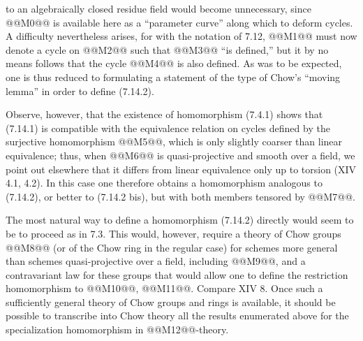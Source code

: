 to an algebraically closed residue field would become unnecessary, since @@M0@@ is available here as a ``parameter curve'' along which to deform cycles. A difficulty nevertheless arises, for with the notation of 7.12, @@M1@@ must now denote a cycle on @@M2@@ such that @@M3@@ ``is defined,'' but it by no means follows that the cycle @@M4@@ is also defined. As was to be expected, one is thus reduced to formulating a statement of the type of Chow's ``moving lemma'' in order to define (7.14.2).

Observe, however, that the existence of homomorphism (7.4.1) shows that (7.14.1) is compatible with the equivalence relation on cycles defined by the surjective homomorphism @@M5@@, which is only slightly coarser than linear equivalence; thus, when @@M6@@ is quasi-projective and smooth over a field, we point out elsewhere that it differs from linear equivalence only up to torsion (XIV 4.1, 4.2). In this case one therefore obtains a homomorphism analogous to (7.14.2), or better to (7.14.2 bis), but with both members tensored by @@M7@@.

The most natural way to define a homomorphism (7.14.2) directly would seem to be to proceed as in 7.3. This would, however, require a theory of Chow groups @@M8@@ (or of the Chow ring in the regular case) for schemes more general than schemes quasi-projective over a field, including @@M9@@, and a contravariant law for these groups that would allow one to define the restriction homomorphism to @@M10@@, @@M11@@. Compare XIV 8. Once such a sufficiently general theory of Chow groups and rings is available, it should be possible to transcribe into Chow theory all the results enumerated above for the specialization homomorphism in @@M12@@-theory.

